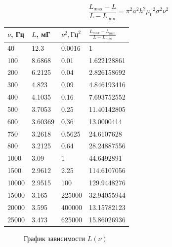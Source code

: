 \documentclass[a4paper, 12pt]{article}
\begin{document}
\begin{equation*}
    \frac{L_{\max} - L}{L - L_{\min}} = \pi ^2 a^2 h^2 {\mu_0}^2 \sigma^2 \nu^2
\end{equation*}
\newpage
\begin{table}[!ht]
    \centering
    \begin{tabular}{|l|l|l|l|}
    \hline
        $\nu$, Гц & $L$, мГ & ${\nu}^2, \text{Гц}^2$ & $\frac{L_{max} - L_{min}}{L-L_{min}}$ \\ \hline
        40 & 12.3 & 0.0016 & 1 \\ \hline
        100 & 8.6868 & 0.01 & 1.622128861 \\ \hline
        200 & 6.2125 & 0.04 & 2.826158692 \\ \hline
        300 & 4.823 & 0.09 & 4.846193416 \\ \hline
        400 & 4.1035 & 0.16 & 7.693752552 \\ \hline
        500 & 3.7053 & 0.25 & 11.40142805 \\ \hline
        600 & 3.60369 & 0.36 & 13.0000414 \\ \hline
        750 & 3.2618 & 0.5625 & 24.6107628 \\ \hline
        800 & 3.2125 & 0.64 & 28.24887556 \\ \hline
        1000 & 3.09 & 1 & 44.6492891 \\ \hline
        1500 & 2.9612 & 2.25 & 114.6107056 \\ \hline
        10000 & 2.9515 & 100 & 129.9448276 \\ \hline
        15000 & 3.165 & 225000 & 32.94055944 \\ \hline
        20000 & 3.595 & 400000 & 13.15782123 \\ \hline
        25000 & 3.473 & 625000 & 15.86026936 \\ \hline
    \end{tabular}
\end{table}
\begin{figure}[h]
    \caption{График зависимости $L(\nu)$}\label{fig:L_nu}
    \newpage
\end{figure}
\end{document}

